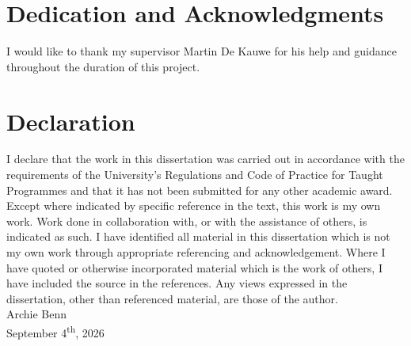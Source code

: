 \newpage
\section*{Dedication and Acknowledgments}
I would like to thank my supervisor Martin De Kauwe for his help and guidance throughout the duration of this project.

\section*{Declaration}
I declare that the work in this dissertation was carried out in accordance with the requirements of the University’s Regulations and Code of Practice for Taught Programmes and that it has not been submitted for any other academic award. Except where indicated by specific reference in the text, this work is my own work. Work done in collaboration with, or with the assistance of others, is indicated as such. I have identified all material in this dissertation which is not my own work through appropriate referencing and acknowledgement. Where I have quoted or otherwise incorporated material which is the work of others, I have included the source in the references. Any views expressed in the dissertation, other than referenced material, are those of the author. \newline \\Archie Benn
\\ September 4\textsuperscript{th}, 2026
\newpage
